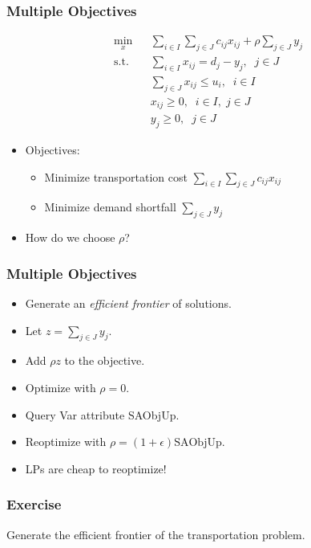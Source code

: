 \documentclass[12pt,handout]{beamer}
\begin{document}
\begin{frame}
\frametitle{Multiple Objectives}
\begin{eqnarray}
\min_{x} && \sum_{i \in I} \sum_{j \in J} c_{ij} x_{ij} + \rho \sum_{j \in J} y_j \nonumber \\
\mbox{s.t.} && \sum_{i \in I} x_{ij} = d_j - y_j,\;\;j \in J \nonumber \\
&& \sum_{j \in J} x_{ij} \le u_i,\;\;i \in I \nonumber \\
&& x_{ij} \ge 0, \;\;i \in I,\;j \in J \nonumber \\
&& y_j \ge 0,\;\;j \in J \nonumber \end{eqnarray}
\begin{itemize}
\item Objectives:
    \begin{itemize}
    \item Minimize transportation cost $\sum_{i \in I} \sum_{j \in J} c_{ij} x_{ij}$
    \item Minimize demand shortfall $\sum_{j \in J} y_j$
    \end{itemize}
\item How do we choose $\rho$?
\end{itemize}
\end{frame}

\begin{frame}
\frametitle{Multiple Objectives}
\begin{itemize}
\item Generate an {\em efficient frontier} of solutions.
\item Let $z = \sum_{j \in J} y_j$.
\item Add $\rho z$ to the objective.
\item Optimize with $\rho = 0$.
\item Query Var attribute SAObjUp.
\item Reoptimize with $\rho = (1+\epsilon)\mbox{SAObjUp}$.
\item LPs are cheap to reoptimize!
\end{itemize}
\end{frame}

{
\begin{frame}
\frametitle{Exercise}
Generate the efficient frontier of the transportation problem.
\end{frame}
}
\end{document}
